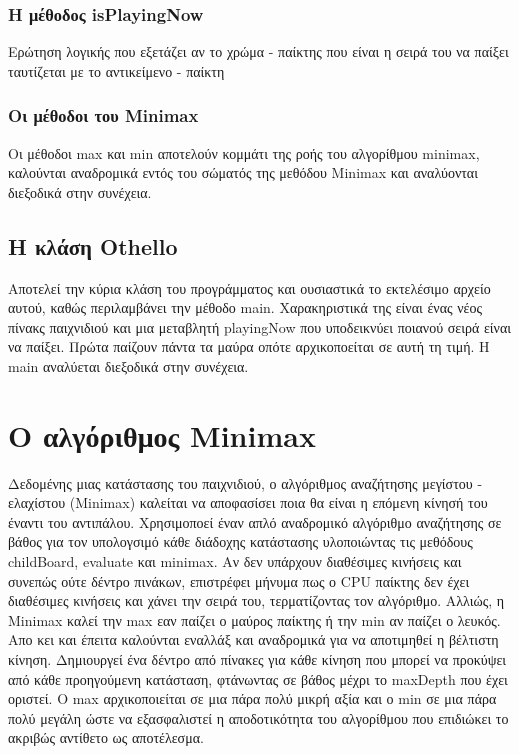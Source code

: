 \documentclass[12pt]{article}
\begin{document}
        \subsubsection{Η μέθοδος isPlayingNow}
        Ερώτηση λογικής που εξετάζει αν το χρώμα - παίκτης που είναι η σειρά του να παίξει ταυτίζεται με το αντικείμενο - παίκτη
        \subsubsection{Οι μέθοδοι του Minimax}
        Οι μέθοδοι max και min αποτελούν κομμάτι της ροής του αλγορίθμου minimax, καλούνται αναδρομικά εντός του σώματός της μεθόδου Minimax και αναλύονται διεξοδικά στην συνέχεια.
    \subsection{Η κλάση Othello}
    Αποτελεί την κύρια κλάση του προγράμματος και ουσιαστικά το εκτελέσιμο αρχείο αυτού, καθώς περιλαμβάνει την μέθοδο main. Χαρακηριστικά της είναι ένας νέος πίνακς παιχνιδιού και μια μεταβλητή playingNow που υποδεικνύει ποιανού σειρά είναι να παίξει. Πρώτα παίζουν πάντα τα μαύρα οπότε αρχικοποείται σε αυτή τη τιμή. Η main αναλύεται διεξοδικά στην συνέχεια. 
\section{Ο αλγόριθμος Minimax}

Δεδομένης μιας κατάστασης του παιχνιδιού, ο αλγόριθμος αναζήτησης μεγίστου - ελαχίστου (Minimax) καλείται να αποφασίσει ποια θα είναι η επόμενη κίνησή του έναντι του αντιπάλου. Χρησιμοποεί έναν απλό αναδρομικό αλγόριθμο αναζήτησης σε βάθος για τον υπολογσιμό κάθε διάδοχης κατάστασης υλοποιώντας τις μεθόδους childBoard, evaluate και minimax. Αν δεν υπάρχουν διαθέσιμες κινήσεις και συνεπώς ούτε δέντρο πινάκων, επιστρέφει μήνυμα πως ο CPU παίκτης δεν έχει διαθέσιμες κινήσεις και χάνει την σειρά του, τερματίζοντας τον αλγόριθμο. Αλλιώς, η Minimax καλεί την max εαν παίζει ο μαύρος παίκτης ή την min αν παίζει ο λευκός. Απο κει και έπειτα καλούνται εναλλάξ και αναδρομικά για να αποτιμηθεί η βέλτιστη κίνηση. Δημιουργεί ένα δέντρο από πίνακες για κάθε κίνηση που μπορεί να προκύψει από κάθε προηγούμενη κατάσταση, φτάνωντας σε βάθος μέχρι το maxDepth που έχει οριστεί. Ο max αρχικοποιείται σε μια πάρα πολύ μικρή αξία και ο min σε μια πάρα πολύ μεγάλη ώστε να εξασφαλιστεί η αποδοτικότητα του αλγορίθμου που επιδιώκει το ακριβώς αντίθετο ως αποτέλεσμα. 
\end{document}
